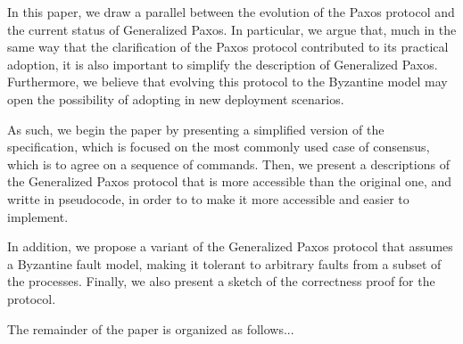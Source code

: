 
In this paper, we draw a parallel between the evolution of the Paxos
protocol and the current status of Generalized Paxos. In particular,
we argue that, much in the same way that the clarification of the Paxos
protocol contributed to its practical adoption, it is also important
to simplify the description of Generalized Paxos. Furthermore, we believe
that evolving this protocol to the Byzantine model may open the
possibility of adopting in new deployment scenarios.


As such, we begin the paper by presenting a simplified version of the
specification, which is focused on the most commonly used case of
consensus, which is to agree on a sequence of commands.  Then, we
present a descriptions of the Generalized Paxos protocol that is more
accessible than the original one, and writte in pseudocode, in order
to to make it more accessible and easier to implement.

In addition, we propose a variant of the Generalized Paxos protocol
that assumes a Byzantine fault model, making it tolerant to arbitrary
faults from a subset of the processes. Finally, we also
present a sketch of the correctness proof for the protocol.

The remainder of the paper is organized as follows...
